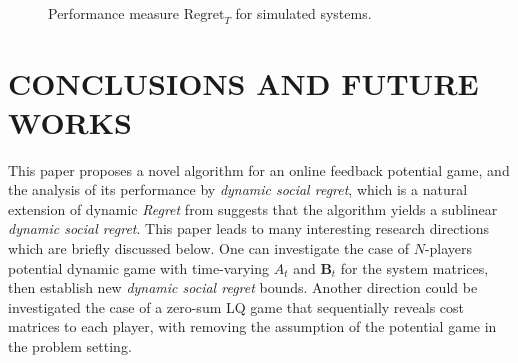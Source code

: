 \documentclass[letterpaper, 10 pt, conference]{ieeeconf}  %
\begin{document}
\begin{figure}
        \label{fig:experiments}
     \centering
    \\
    \caption{Performance measure $\text{Regret}_{T}$ for simulated systems.}
\end{figure}

\section{CONCLUSIONS AND FUTURE WORKS}
This paper proposes a novel algorithm for an online feedback potential game, and the analysis of its performance by \emph{dynamic social regret}, which is a natural extension of dynamic \emph{Regret} from \cite[Equation (5)]{chen_regret_2022} suggests that the algorithm yields a sublinear \emph{dynamic social regret}. This paper leads to many interesting research directions which are briefly discussed below. One can investigate the case of $N$-players potential dynamic game with time-varying $A_{t}$ and $\mathbf{B}_{t}$ for the system matrices, then establish new \emph{dynamic social regret} bounds. Another direction could be investigated the case of a zero-sum LQ game that sequentially reveals cost matrices to each player, with removing the assumption of the potential game in the problem setting.
\end{document}
